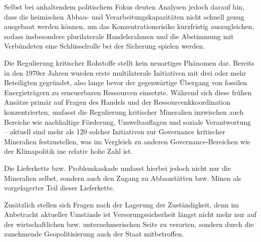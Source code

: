 \documentclass[12pt,a4paper,oneside]{book} %
\begin{document}
	Selbst bei anhaltendem politischem Fokus deuten Analysen jedoch darauf hin, dass die heimischen Abbau- und Verarbeitungskapazitäten nicht schnell genug ausgebaut werden können, um das Konzentrationsrisiko kurzfristig auszugleichen, sodass insbesondere plurilaterale Handelsrahmen und die Abstimmung mit Verbündeten eine Schlüsselrolle bei der Sicherung spielen werden.\autocite{Trade policy and the 2026 redesign of critical mineral supply chains}
	
	Die Regulierung kritischer Rohstoffe stellt kein neuartiges Phänomen dar. Bereits in den 1970er Jahren wurden erste multilaterale Initiativen mit drei oder mehr Beteiligten gegründet, also lange bevor der gegenwärtige Übergang von fossilen Energieträgern zu erneuerbaren Ressourcen einsetzte. Während sich diese frühen Ansätze primär auf Fragen des Handels und der Ressourcenkkoordination konzentrierten, umfasst die Regulierung kritischer Mineralien inzwischen auch Bereiche wie nachhaltige Förderung, Umweltauflagen und soziale Verantwortung -- aktuell sind mehr als 120 solcher Initiativen zur Governance kritischer Mineralien festzustellen, was im Vergleich zu anderen Governance-Bereichen wie der Klimapolitik ine relativ hohe Zahl ist.\autocite[Die überwiegend unverbindlichen Initiativen im Bereich kritischer Rohstoffe lassen sich im Wesentlichen in Grundsätze und freiwillige Standards einerseits sowie in Verbände, Partnerschaften und Nichtregierungsorganisationen andererseits einordnen, wobei nahezu alle großen internationalen Organisationen inzwischen über entsprechende Governance-Einheiten verfügen, deren vielfach überschneidende Aktivitäten jedoch potenziell einen künftigen Wettbewerb um Ressourcen hervorrufen könnten. Viele Initiativen konzentrieren sich eher auf einzelne Mineralien wie Kobalt oder Kupfer als auf den gesamten CRM-Sektor, richten ihren thematischen Fokus auf Lieferketten, Industrieentwicklung und verantwortungsvolle Abbaupraktiken, weisen jedoch zugleich erhebliche Transparenzdefizite entlang der Wertschöpfungskette auf – insbesondere in den späteren Phasen der Verarbeitung und Veredelung, die kaum koordiniert adressiert werden, während Menschenrechtsaspekte insgesamt nur eine untergeordnete Rolle spielen.]{UI Report, S. 7}
	
	Die Lieferkette bzw. Problemkaskade umfasst hierbei jedoch nicht nur die Mineralien selbst, sondern auch den Zugang zu Abbaustätten bzw. Minen als vorgelagerter Teil dieser Lieferkette.
	
	Zusätzlich stellen sich Fragen nach der Lagerung der Zuständigkeit, denn im Anbetracht aktueller Umstände ist Versorungssicherheit längst nicht mehr nur auf der wirtschaftlichen bzw. unternehmerischen Seite zu verorten, sondern durch die zunehmende Geopolitisierung auch der Staat mitbetroffen.
	
\end{document}
